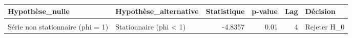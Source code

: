 \centering
\centering
\begin{tabular}[t]{llrrrl}
\toprule
Hypothèse\_nulle & Hypothèse\_alternative & Statistique & p-value & Lag & Décision\\
\midrule
\cellcolor{gray!10}{Série non stationnaire (phi = 1)} & \cellcolor{gray!10}{Explosive (phi > 1)} & \cellcolor{gray!10}{-4.8357} & \cellcolor{gray!10}{0.99} & \cellcolor{gray!10}{4} & \cellcolor{gray!10}{Ne pas rejeter H\_0}\\
Série non stationnaire (phi = 1) & Stationnaire (phi < 1) & -4.8357 & 0.01 & 4 & Rejeter H\_0\\
\bottomrule
\end{tabular}

